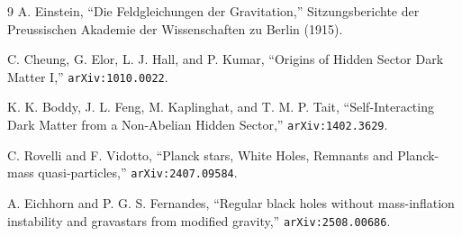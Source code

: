\documentclass[11pt]{article}
\theoremstyle{remark}
\begin{document}
\begin{thebibliography}{9}
A. Einstein,
``Die Feldgleichungen der Gravitation,''
Sitzungsberichte der Preussischen Akademie der Wissenschaften zu Berlin (1915).

C. Cheung, G. Elor, L. J. Hall, and P. Kumar,
``Origins of Hidden Sector Dark Matter I,''
\texttt{arXiv:1010.0022}.

K. K. Boddy, J. L. Feng, M. Kaplinghat, and T. M. P. Tait,
``Self-Interacting Dark Matter from a Non-Abelian Hidden Sector,''
\texttt{arXiv:1402.3629}.

C. Rovelli and F. Vidotto,
``Planck stars, White Holes, Remnants and Planck-mass quasi-particles,''
\texttt{arXiv:2407.09584}.

A. Eichhorn and P. G. S. Fernandes,
``Regular black holes without mass-inflation instability and gravastars from modified gravity,''
\texttt{arXiv:2508.00686}.
\end{thebibliography}
\end{document}
